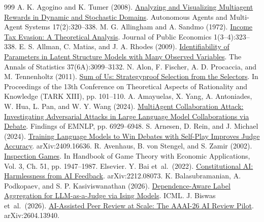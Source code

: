 \documentclass[12pt,letterpaper]{article}
\begin{document}
\begin{thebibliography}{999}
\setlength{\itemsep}{2pt}
 A. K. Agogino and K. Tumer (2008). \href{https://doi.org/10.1007/s10458-008-9046-9}{Analyzing and Visualizing Multiagent Rewards in Dynamic and Stochastic Domains}. Autonomous Agents and Multi-Agent Systems 17(2):320--338.
 M. G. Allingham and A. Sandmo (1972). \href{https://doi.org/10.1016/0047-2727(72)90010-2}{Income Tax Evasion: A Theoretical Analysis}. Journal of Public Economics 1(3--4):323--338.
 E. S. Allman, C. Matias, and J. A. Rhodes (2009). \href{https://doi.org/10.1214/09-AOS689}{Identifiability of Parameters in Latent Structure Models with Many Observed Variables}. The Annals of Statistics 37(6A):3099--3132.
 N. Alon, F. Fischer, A. D. Procaccia, and M. Tennenholtz (2011). \href{https://doi.org/10.1145/2000378.2000390}{Sum of Us: Strategyproof Selection from the Selectors}. In Proceedings of the 13th Conference on Theoretical Aspects of Rationality and Knowledge (TARK XIII), pp. 101--110.
 A. Amayuelas, X. Yang, A. Antoniades, W. Hua, L. Pan, and W. Y. Wang (2024). \href{https://arxiv.org/abs/2406.14711}{MultiAgent Collaboration Attack: Investigating Adversarial Attacks in Large Language Model Collaborations via Debate}. Findings of EMNLP, pp. 6929--6948.
 S. Arnesen, D. Rein, and J. Michael (2024). \href{https://arxiv.org/abs/2409.16636}{Training Language Models to Win Debates with Self-Play Improves Judge Accuracy}. arXiv:2409.16636.
 R. Avenhaus, B. von Stengel, and S. Zamir (2002). \href{https://doi.org/10.1016/S1574-0005(02)03014-X}{Inspection Games}. In Handbook of Game Theory with Economic Applications, Vol. 3, Ch. 51, pp. 1947--1987. Elsevier.
 Y. Bai et~al.\ (2022). \href{https://arxiv.org/abs/2212.08073}{Constitutional AI: Harmlessness from AI Feedback}. arXiv:2212.08073.
 K. Balasubramanian, A. Podkopaev, and S. P. Kasiviswanathan (2026). \href{https://arxiv.org/abs/2601.22336}{Dependence-Aware Label Aggregation for LLM-as-a-Judge via Ising Models}. ICML.
 J. Biswas et~al.\ (2026). \href{https://arxiv.org/abs/2604.13940}{AI-Assisted Peer Review at Scale: The AAAI-26 AI Review Pilot}. arXiv:2604.13940.

\end{thebibliography}
\end{document}
